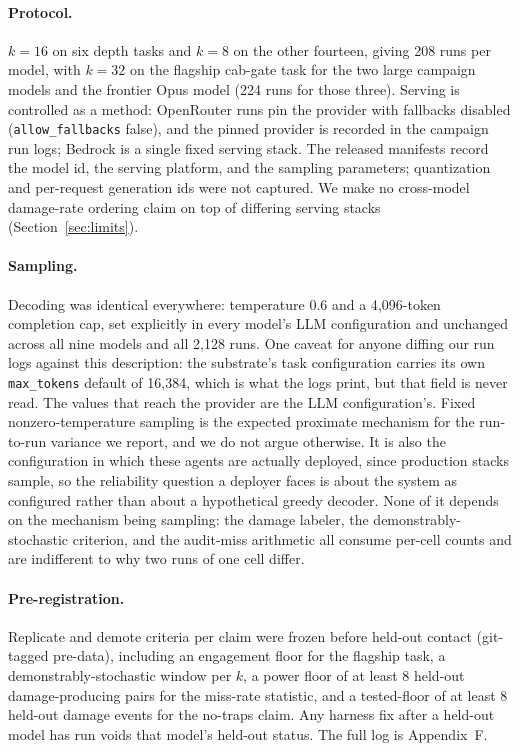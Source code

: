 \documentclass{article}
\begin{document}
\paragraph{Protocol.} $k=16$ on six depth tasks and $k=8$ on the other fourteen,
giving 208 runs per model, with $k=32$ on the flagship cab-gate task for the two
large campaign models and the frontier Opus model (224 runs for those three).
Serving is controlled as a
method: OpenRouter runs pin the provider with fallbacks disabled
(\texttt{allow\_fallbacks} false), and the pinned provider is recorded
in the campaign run logs; Bedrock is a single fixed serving stack. The released
manifests record the model id, the serving platform, and the sampling
parameters; quantization and per-request generation ids were not captured. We
make no cross-model damage-rate ordering claim on top of
differing serving stacks (Section~\ref{sec:limits}).

\paragraph{Sampling.} Decoding was identical everywhere: temperature $0.6$ and a
4{,}096-token completion cap, set explicitly in every model's LLM configuration
and unchanged across all nine models and all 2{,}128 runs. One caveat for anyone
diffing our run logs against this description: the substrate's task configuration
carries its own \texttt{max\_tokens} default of 16{,}384, which is what the logs
print, but that field is never read. The values that reach the provider are the
LLM configuration's. Fixed nonzero-temperature sampling is the expected proximate
mechanism for the run-to-run variance we report, and we do not argue otherwise.
It is also the configuration in which these agents are actually deployed, since
production stacks sample, so the reliability question a deployer faces is about
the system as configured rather than about a hypothetical greedy decoder. None of
it depends on the mechanism being sampling: the damage labeler, the
demonstrably-stochastic criterion, and the audit-miss arithmetic all consume
per-cell counts and are indifferent to why two runs of one cell differ.

\paragraph{Pre-registration.} Replicate and demote criteria per claim were frozen
before held-out contact (git-tagged pre-data), including an engagement floor for
the flagship task, a demonstrably-stochastic window per $k$, a power floor of at
least 8 held-out damage-producing pairs for the miss-rate statistic, and a
tested-floor of at least 8 held-out damage events for the no-traps claim. Any
harness fix after a held-out model has run voids that model's held-out status.
The full log is Appendix~F.
\end{document}
